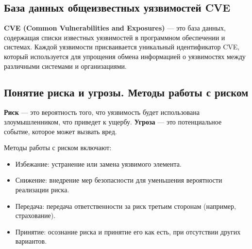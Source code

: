 \subsection*{База данных общеизвестных уязвимостей CVE}

\textbf{CVE (Common Vulnerabilities and Exposures)} --- это база данных,
содержащая списки известных уязвимостей в программном обеспечении и системах.
Каждой уязвимости присваивается уникальный идентификатор CVE,
который используется
для упрощения обмена информацией о уязвимостях между различными системами и организациями.

\subsection*{Понятие риска и угрозы. Методы работы с риском}

\textbf{Риск} --- это вероятность того,
что уязвимость будет использована злоумышленником, что приведет к ущербу.
\textbf{Угроза} --- это потенциальное событие, которое может вызвать вред.

Методы работы с риском включают:

\begin{itemize}
	\item Избежание: устранение или замена уязвимого элемента.
	\item Снижение:
		внедрение мер безопасности для уменьшения вероятности реализации риска.
	\item Передача:
		передача ответственности за риск третьим сторонам
		(например, страхование).
	\item Принятие:
		осознание риска и принятие его как есть,
		при отсутствии других вариантов.
\end{itemize}

